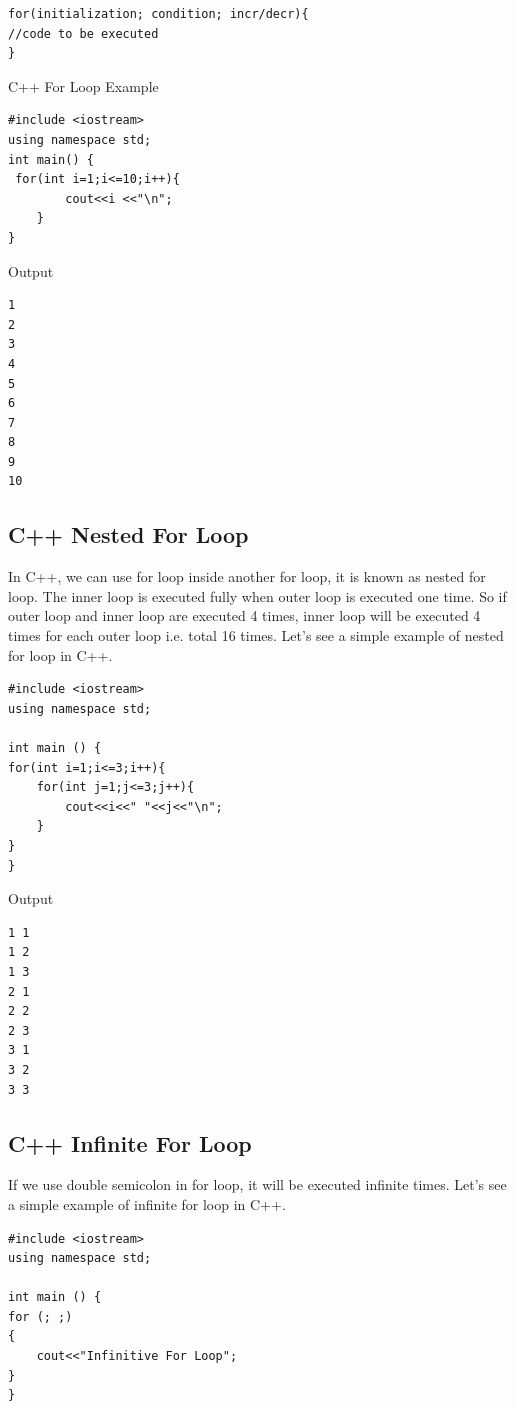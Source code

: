 \documentclass{book}
\begin{document}
\begin{lstlisting}
for(initialization; condition; incr/decr){    
//code to be executed    
}    
\end{lstlisting}

C++ For Loop Example

\begin{lstlisting}
#include <iostream>  
using namespace std;  
int main() {  
 for(int i=1;i<=10;i++){      
		cout<<i <<"\n";      
	}       
}   
\end{lstlisting}

Output 

\begin{lstlisting}
1
2
3
4
5
6
7
8
9
10
\end{lstlisting}

\subsection{C++ Nested For Loop}

In C++, we can use for loop inside another for loop, it is known as nested for loop. The inner loop is executed fully when outer loop is executed one time. So if outer loop and inner loop are executed 4 times, inner loop will be executed 4 times for each outer loop i.e. total 16 times. Let's see a simple example of nested for loop in C++.

\begin{lstlisting}
#include <iostream>  
using namespace std;  
   
int main () {  
for(int i=1;i<=3;i++){      
	for(int j=1;j<=3;j++){      
		cout<<i<<" "<<j<<"\n";      
	}     
}  
} 
\end{lstlisting}

Output 

\begin{lstlisting}
1 1
1 2
1 3
2 1
2 2 
2 3
3 1
3 2
3 3
\end{lstlisting}

\subsection{C++ Infinite For Loop}

If we use double semicolon in for loop, it will be executed infinite times. Let's see a simple example of infinite for loop in C++.

\begin{lstlisting}
#include <iostream>  
using namespace std;  
   
int main () {  
for (; ;)    
{    
	cout<<"Infinitive For Loop";    
}    
}    
\end{lstlisting}
\end{document}
